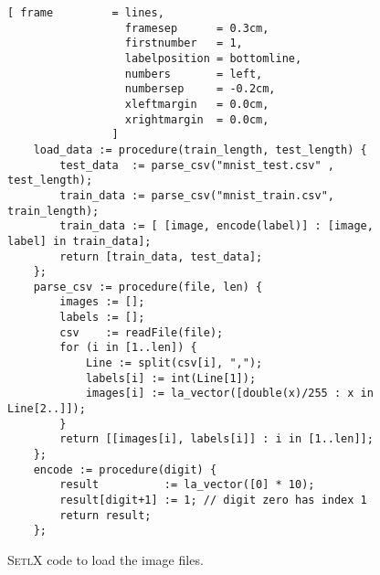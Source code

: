 \begin{figure}[!ht]
\centering
\begin{Verbatim}[ frame         = lines, 
                  framesep      = 0.3cm, 
                  firstnumber   = 1,
                  labelposition = bottomline,
                  numbers       = left,
                  numbersep     = -0.2cm,
                  xleftmargin   = 0.0cm,
                  xrightmargin  = 0.0cm,
                ]
    load_data := procedure(train_length, test_length) {
        test_data  := parse_csv("mnist_test.csv" , test_length);
        train_data := parse_csv("mnist_train.csv", train_length);
        train_data := [ [image, encode(label)] : [image, label] in train_data];
        return [train_data, test_data];
    };
    parse_csv := procedure(file, len) {
        images := [];
        labels := [];
        csv    := readFile(file);
        for (i in [1..len]) {
            Line := split(csv[i], ",");
            labels[i] := int(Line[1]);                                  
            images[i] := la_vector([double(x)/255 : x in Line[2..]]); 
        }
        return [[images[i], labels[i]] : i in [1..len]];
    };
    encode := procedure(digit) {  
        result          := la_vector([0] * 10);
        result[digit+1] := 1; // digit zero has index 1
        return result;
    };
\end{Verbatim}
\vspace*{-0.3cm}
\caption{\textsc{SetlX} code to load the image files.}
\label{fig:nn-loader.stlx}
\end{figure}

